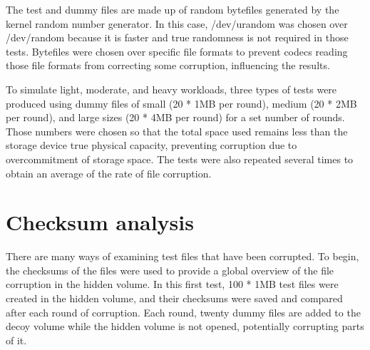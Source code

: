 \documentclass[a4paper,11pt,oneside]{report}
\begin{document}
The test and dummy files are made up of random bytefiles generated by the kernel random number generator. In this case, /dev/urandom was chosen over /dev/random because it is faster and true randomness is not required in those tests. Bytefiles were chosen over specific file formats to prevent codecs reading those file formats from correcting some corruption, influencing the results.

To simulate light, moderate, and heavy workloads, three types of tests were produced using dummy files of small (20 * 1MB per round), medium (20 * 2MB per round), and large sizes (20 * 4MB per round) for a set number of rounds. Those numbers were chosen so that the total space used remains less than the storage device true physical capacity, preventing corruption due to overcommitment of storage space. The tests were also repeated several times to obtain an average of the rate of file corruption.

\section{Checksum analysis}

There are many ways of examining test files that have been corrupted. To begin, the checksums of the files were used to provide a global overview of the file corruption in the hidden volume. In this first test, 100 * 1MB test files were created in the hidden volume, and their checksums were saved and compared after each round of corruption. Each round, twenty dummy files are added to the decoy volume while the hidden volume is not opened, potentially corrupting parts of it.
\end{document}
